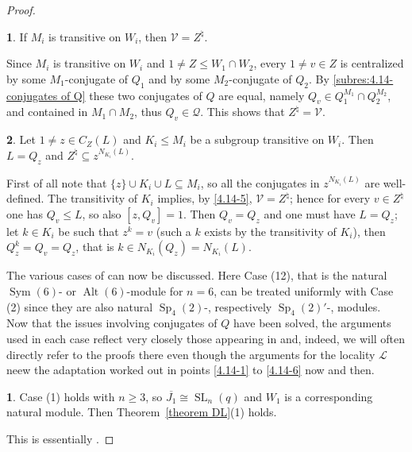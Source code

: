 \documentclass{amsart}
\numberwithin{equation}{section}
\theoremstyle{definition}
\theoremstyle{subresult}
\newtheorem{subresult}{}[equation]
\theoremstyle{caseresult}
\newtheorem{caseresult}{}[equation]
\renewcommand{\L}{\mathcal{L}}
\newcommand{\V}{\mathcal{V}}
\newcommand{\SL}{\operatorname{SL}}
\newcommand{\Sp}{\operatorname{Sp}}
\newcommand{\Sym}{\operatorname{Sym}}
\newcommand{\Alt}{\operatorname{Alt}}
\newcommand{\ov}{\overline}
\newcommand{\norm}{\trianglelefteq}
\newcommand{\<}{\langle}
\renewcommand{\>}{\rangle}
\begin{document}
\begin{proof}
	\begin{subresult}\label{4.14-5}
		If $M_i$ is transitive on $W_i$, then $\V = Z^\natural$.
	\end{subresult}
	Since $M_i$ is transitive on $W_i$ and $1 \ne Z \le W_1 \cap W_2$, every $1 \ne v \in Z$ is centralized by some $M_1$-conjugate of $Q_1$ and by some $M_2$-conjugate of $Q_2$. By \eqref{subres:4.14-conjugates of Q} these two conjugates of $Q$ are equal, namely $Q_v \in Q_1^{M_1} \cap Q_2^{M_2}$, and contained in $M_1 \cap M_2$, thus $Q_v \in \mathcal{Q}$. This shows that $Z^\natural = \V$.
	
	\begin{subresult}\label{4.14-6}
		Let $1 \ne z \in C_Z(L)$ and $K_i \le M_i$ be a subgroup transitive on $W_i$. Then $L = Q_z$ and $Z^\natural \subseteq z^{N_{K_i}(L)}$.
	\end{subresult}
	First of all note that $\{z\} \cup K_i \cup L \subseteq M_i$, so all the conjugates in $z^{N_{K_i}(L)}$ are well-defined. The transitivity of $K_i$ implies, by \eqref{4.14-5}, $\V=Z^\natural$; hence for every $v \in Z^\natural$ one has $Q_v \le L$, so also $[z,Q_v]=1$. Then $Q_v = Q_z$ and one must have $L = Q_z$; let $k \in K_i$ be such that $z^k=v$ (such a $k$ exists by the transitivity of $K_i$), then $Q_z^k = Q_v = Q_z$, that is $k \in N_{K_i}(Q_z) = N_{K_i}(L)$.
	
	
	
	\vspace{0.60cm}
	
	The various cases of \cite[Theorem C.3]{Meier-Stell-Stroth:2012} can now be discussed. Here Case (12), that is the natural $\Sym(6)$- or $\Alt(6)$-module for $n=6$, can be treated uniformly with Case (2) since they are also natural $\Sp_4(2)$-, respectively $\Sp_4(2)'$-, modules.\\
	Now that the issues involving conjugates of $Q$ have been solved, the arguments used in each case reflect very closely those appearing in \cite[Lemma 4.14]{Meier-Stell-Stroth:2012} and, indeed, we will often directly refer to the proofs there even though the arguments for the locality $\L$ neew the adaptation worked out in points \eqref{4.14-1} to \eqref{4.14-6} now and then.
	
	
	\begin{caseresult}
		Case (1) holds with $n \ge 3$, so $\ov{J_1} \cong \SL_n(q)$ and $W_1$ is a corresponding natural module. Then Theorem~\ref{theorem DL}(1) holds.
	\end{caseresult}
	This is essentially \cite[Lemma 4.14, Case 1]{Meier-Stell-Stroth:2012}.
	

\end{proof}
\end{document}
